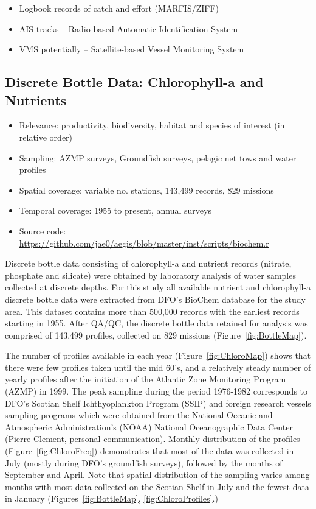 \documentclass[letterpaper,portrait,11pt]{scrartcl}
\numberwithin{equation}{section}    %
\numberwithin{figure}{section}    %
\numberwithin{table}{section}       %
\begin{document}
\begin{itemize}
	\item Logbook records of catch and effort (MARFIS/ZIFF)
  \item AIS tracks -- Radio-based Automatic Identification System
  \item VMS potentially -- Satellite-based Vessel Monitoring System
\end{itemize}

\subsection{Discrete Bottle Data: Chlorophyll-a and Nutrients}

\begin{itemize}
  \item Relevance: productivity, biodiversity, habitat and species of interest (in relative order)
  \item Sampling: AZMP surveys, Groundfish surveys, pelagic net tows and water profiles
  \item Spatial coverage: variable no. stations, 143,499 records, 829 missions
  \item Temporal coverage: 1955 to present, annual surveys
  \item Source code: \url{https://github.com/jae0/aegis/blob/master/inst/scripts/biochem.r}
\end{itemize}

Discrete bottle data consisting of chlorophyll-a and nutrient records (nitrate, phosphate and silicate) were obtained by laboratory analysis of water samples collected at discrete depths. For this study all available nutrient and chlorophyll-a discrete bottle data were extracted from DFO's BioChem database for the study area. This dataset contains more than 500,000 records with the earliest records starting in 1955. After QA/QC, the discrete bottle data retained for analysis was comprised of 143,499 profiles, collected on 829 missions (Figure~\ref{fig:BottleMap}).

The number of profiles available in each year (Figure~\ref{fig:ChloroMap}) shows that there were few profiles taken until the mid 60's, and a relatively steady number of yearly profiles after the initiation of the Atlantic Zone Monitoring Program (AZMP) in 1999. The peak sampling during the period 1976-1982 corresponds to DFO's Scotian Shelf Ichthyoplankton Program (SSIP) and foreign research vessels sampling programs which were obtained from the National Oceanic and Atmospheric Administration's (NOAA) National Oceanographic Data Center (Pierre Clement, personal communication).  Monthly distribution of the profiles (Figure~\ref{fig:ChloroFreq})  demonstrates that most of the data was collected in July (mostly during DFO's groundfish surveys), followed by the months of September and April. Note that spatial distribution of the sampling varies among months with most data collected on the Scotian Shelf in July and the fewest data in January (Figures~\ref{fig:BottleMap}, \ref{fig:ChloroProfiles}.)
\end{document}

